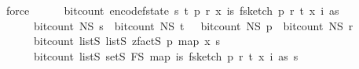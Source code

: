 \begin{isabellebody}
\ force\isanewline
\isanewline
\ \ \ \ \isamarkupfalse%
\ {\isachardoublequoteopen}bit{\isacharunderscore}{\kern0pt}count\ {\isacharparenleft}{\kern0pt}encode{\isacharunderscore}{\kern0pt}f{}{\isacharunderscore}{\kern0pt}state\ {\isacharparenleft}{\kern0pt}s{\isacharcomma}{\kern0pt}\ t{\isacharcomma}{\kern0pt}\ p{\isacharcomma}{\kern0pt}\ r{\isacharcomma}{\kern0pt}\ x{\isacharcomma}{\kern0pt}\ {\isasymlambda}i{\isasymin}{\isacharbraceleft}{\kern0pt}{}{\isachardot}{\kern0pt}{\isachardot}{\kern0pt}{\isacharless}{\kern0pt}s{\isacharbraceright}{\kern0pt}{\isachardot}{\kern0pt}\ f{}{\isacharunderscore}{\kern0pt}sketch\ p\ r\ t\ {\isacharparenleft}{\kern0pt}x\ i{\isacharparenright}{\kern0pt}\ as{\isacharparenright}{\kern0pt}{\isacharparenright}{\kern0pt}\ {\isacharequal}{\kern0pt}\isanewline
\ \ \ \ \ \ bit{\isacharunderscore}{\kern0pt}count\ {\isacharparenleft}{\kern0pt}N\isactrlsub S\ s{\isacharparenright}{\kern0pt}\ {\isacharplus}{\kern0pt}\ bit{\isacharunderscore}{\kern0pt}count\ {\isacharparenleft}{\kern0pt}N\isactrlsub S\ t{\isacharparenright}{\kern0pt}\ {\isacharplus}{\kern0pt}\ \ bit{\isacharunderscore}{\kern0pt}count\ {\isacharparenleft}{\kern0pt}N\isactrlsub S\ p{\isacharparenright}{\kern0pt}\ {\isacharplus}{\kern0pt}\ bit{\isacharunderscore}{\kern0pt}count\ {\isacharparenleft}{\kern0pt}N\isactrlsub S\ r{\isacharparenright}{\kern0pt}\ {\isacharplus}{\kern0pt}\isanewline
\ \ \ \ \ \ bit{\isacharunderscore}{\kern0pt}count\ {\isacharparenleft}{\kern0pt}list\isactrlsub S\ {\isacharparenleft}{\kern0pt}list\isactrlsub S\ {\isacharparenleft}{\kern0pt}zfact\isactrlsub S\ p{\isacharparenright}{\kern0pt}{\isacharparenright}{\kern0pt}\ {\isacharparenleft}{\kern0pt}map\ x\ {\isacharbrackleft}{\kern0pt}{}{\isachardot}{\kern0pt}{\isachardot}{\kern0pt}{\isacharless}{\kern0pt}s{\isacharbrackright}{\kern0pt}{\isacharparenright}{\kern0pt}{\isacharparenright}{\kern0pt}\ {\isacharplus}{\kern0pt}\isanewline
\ \ \ \ \ \ bit{\isacharunderscore}{\kern0pt}count\ {\isacharparenleft}{\kern0pt}list\isactrlsub S\ {\isacharparenleft}{\kern0pt}set\isactrlsub S\ F\isactrlsub S{\isacharparenright}{\kern0pt}\ {\isacharparenleft}{\kern0pt}map\ {\isacharparenleft}{\kern0pt}{\isasymlambda}i{\isasymin}{\isacharbraceleft}{\kern0pt}{}{\isachardot}{\kern0pt}{\isachardot}{\kern0pt}{\isacharless}{\kern0pt}s{\isacharbraceright}{\kern0pt}{\isachardot}{\kern0pt}\ f{}{\isacharunderscore}{\kern0pt}sketch\ p\ r\ t\ {\isacharparenleft}{\kern0pt}x\ i{\isacharparenright}{\kern0pt}\ as{\isacharparenright}{\kern0pt}\ {\isacharbrackleft}{\kern0pt}{}{\isachardot}{\kern0pt}{\isachardot}{\kern0pt}{\isacharless}{\kern0pt}s{\isacharbrackright}{\kern0pt}{\isacharparenright}{\kern0pt}{\isacharparenright}{\kern0pt}{\isachardoublequoteclose}\isanewline

\end{isabellebody}
